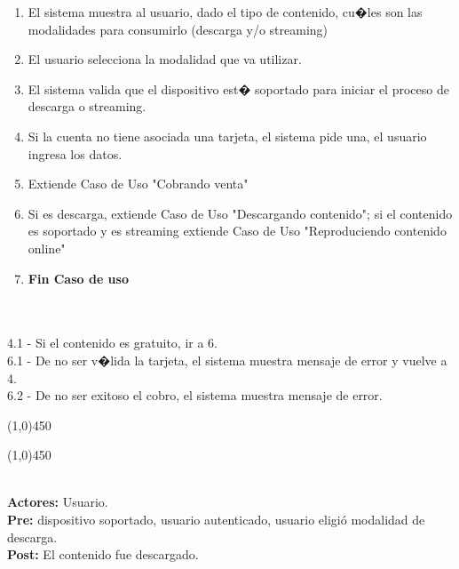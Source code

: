 \documentclass[11pt, a4paper, spanish]{article}
\begin{document}

\begin{enumerate}
	\item El sistema muestra al usuario, dado el tipo de contenido, cu�les son las modalidades para consumirlo (descarga y/o streaming)
	\item El usuario selecciona la modalidad que va utilizar.
	\item El sistema valida que el dispositivo est� soportado para iniciar el proceso de descarga o streaming.
	\item Si la cuenta no tiene asociada una tarjeta, el sistema pide una, el usuario ingresa los datos.
	\item Extiende Caso de Uso "Cobrando venta"
	\item Si es descarga, extiende Caso de Uso "Descargando contenido"; si el contenido es soportado y es streaming extiende Caso de Uso "Reproduciendo contenido online"
	\item \textbf{Fin Caso de uso}
\end{enumerate}

 \\

\\
4.1 - Si el contenido es gratuito, ir a 6.\\
6.1 - De no ser v�lida la tarjeta, el sistema muestra mensaje de error y vuelve a 4.\\
6.2 - De no ser exitoso el cobro, el sistema muestra mensaje de error.\\

\begin{center} \line(1,0){450} \end{center}

\newpage 

\begin{center} \line(1,0){450} \end{center}

 \\
\textbf{Actores:} Usuario. \\
\textbf{Pre:} dispositivo soportado, usuario autenticado, usuario eligi\'o modalidad de descarga. \\
\textbf{Post:} El contenido fue descargado.\\
\end{document}
